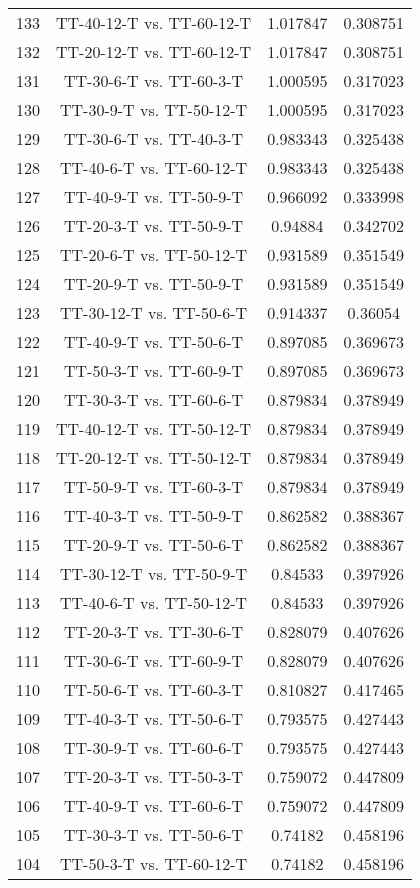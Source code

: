 \documentclass[a4paper,10pt]{article}
\begin{document}
\begin{landscape}
\begin{table}[!htp]
\begin{tabular}{cccc}
133&TT-40-12-T vs. TT-60-12-T&1.017847&0.308751\\
132&TT-20-12-T vs. TT-60-12-T&1.017847&0.308751\\
131&TT-30-6-T vs. TT-60-3-T&1.000595&0.317023\\
130&TT-30-9-T vs. TT-50-12-T&1.000595&0.317023\\
129&TT-30-6-T vs. TT-40-3-T&0.983343&0.325438\\
128&TT-40-6-T vs. TT-60-12-T&0.983343&0.325438\\
127&TT-40-9-T vs. TT-50-9-T&0.966092&0.333998\\
126&TT-20-3-T vs. TT-50-9-T&0.94884&0.342702\\
125&TT-20-6-T vs. TT-50-12-T&0.931589&0.351549\\
124&TT-20-9-T vs. TT-50-9-T&0.931589&0.351549\\
123&TT-30-12-T vs. TT-50-6-T&0.914337&0.36054\\
122&TT-40-9-T vs. TT-50-6-T&0.897085&0.369673\\
121&TT-50-3-T vs. TT-60-9-T&0.897085&0.369673\\
120&TT-30-3-T vs. TT-60-6-T&0.879834&0.378949\\
119&TT-40-12-T vs. TT-50-12-T&0.879834&0.378949\\
118&TT-20-12-T vs. TT-50-12-T&0.879834&0.378949\\
117&TT-50-9-T vs. TT-60-3-T&0.879834&0.378949\\
116&TT-40-3-T vs. TT-50-9-T&0.862582&0.388367\\
115&TT-20-9-T vs. TT-50-6-T&0.862582&0.388367\\
114&TT-30-12-T vs. TT-50-9-T&0.84533&0.397926\\
113&TT-40-6-T vs. TT-50-12-T&0.84533&0.397926\\
112&TT-20-3-T vs. TT-30-6-T&0.828079&0.407626\\
111&TT-30-6-T vs. TT-60-9-T&0.828079&0.407626\\
110&TT-50-6-T vs. TT-60-3-T&0.810827&0.417465\\
109&TT-40-3-T vs. TT-50-6-T&0.793575&0.427443\\
108&TT-30-9-T vs. TT-60-6-T&0.793575&0.427443\\
107&TT-20-3-T vs. TT-50-3-T&0.759072&0.447809\\
106&TT-40-9-T vs. TT-60-6-T&0.759072&0.447809\\
105&TT-30-3-T vs. TT-50-6-T&0.74182&0.458196\\
104&TT-50-3-T vs. TT-60-12-T&0.74182&0.458196\\

\end{tabular}
\end{table}
\end{landscape}
\end{document}
